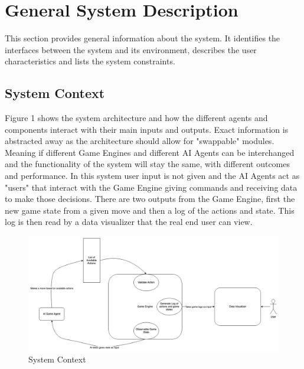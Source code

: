 \documentclass[12pt]{article}
\begin{document}
\newpage
\section{General System Description}

This section provides general information about the system.  It identifies the
interfaces between the system and its environment, describes the user
characteristics and lists the system constraints.

\subsection{System Context}

Figure 1 shows the system architecture and how the different agents and components interact with their main inputs and outputs. Exact information is abstracted away as the architecture should allow for "swappable" modules. Meaning if different Game Engines and different AI Agents can be interchanged and the functionality of the system will stay the same, with different outcomes and performance. In this system user input is not given and the AI Agents act as "users" that interact with the Game Engine giving commands and receiving data to make those decisions. There are two outputs from the Game Engine, first the new game state from a given move and then a log of the actions and state. This log is then read by a data visualizer that the real end user can view.

\begin{figure}[h!]
\begin{center}
 \includegraphics[width=1.0\textwidth]{SystemArchitecture.png}
\caption{System Context}
\label{Fig_SystemContext} 
\end{center}
\end{figure}
\end{document}
